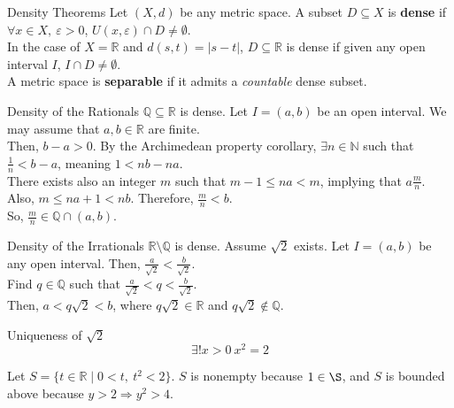 \documentclass[8pt]{extarticle}
\newcommand{\N}{\mathbb{N}}
\newcommand{\Q}{\mathbb{Q}}
\newcommand{\R}{\mathbb{R}}
\begin{document}
  \begin{problem}{Density Theorems}
    Let $(X,d)$ be any metric space. A subset $D\subseteq X$ is \textbf{dense} if $\forall x\in X,~ \varepsilon > 0$, $U(x,\varepsilon) \cap D \neq \emptyset$.\\

    In the case of $X = \R$ and $d(s,t) = |s-t|$, $D\subseteq \R$ is dense if given any open interval $I$, $I\cap D \neq \emptyset$.\\

    A metric space is \textbf{separable} if it admits a \textit{countable} dense subset.
    \begin{problem}{Density of the Rationals}
      $\Q\subseteq\R$ is dense.
      \tcblower
      Let $I = (a,b)$ be an open interval. We may assume that $a,b\in\R$ are finite.\\

      Then, $b-a > 0$. By the Archimedean property corollary, $\exists n\in\N$ such that $\frac{1}{n} < b-a$, meaning $1 < nb-na$.\\

      There exists also an integer $m$ such that $m-1 \leq na < m$, implying that $a \frac{m}{n}$. Also, $m \leq na+1 < nb$. Therefore, $\frac{m}{n} < b$.\\

      So, $\frac{m}{n}\in \Q\cap (a,b)$.
    \end{problem}
    \begin{problem}{Density of the Irrationals}
      $\R\setminus\Q$ is dense.
      \tcblower
      Assume $\sqrt{2}$ exists. Let $I = (a,b)$ be any open interval. Then, $\frac{a}{\sqrt{2}} < \frac{b}{\sqrt{2}}$.\\

      Find $q\in\Q$ such that $\frac{a}{\sqrt{2}} < q < \frac{b}{\sqrt{2}}$.\\

      Then, $a < q\sqrt{2} < b$, where $q\sqrt{2} \in\R$ and $q\sqrt{2}\notin\Q$.
    \end{problem}
    \begin{problem}{Uniqueness of $\sqrt{2}$}
      \[
        \exists! x>0~x^2 = 2
      \] 
      \tcblower
      \begin{description}[font=\normalfont]
        \item[Existence:] Let $S = \{t\in\R \mid 0 <t,~t^2<2\}$. $S$ is nonempty because $1\in\S$, and $S$ is bounded above because $y > 2 \Rightarrow y^2 > 4$.\\


\end{description}
\end{problem}
\end{problem}
\end{document}
